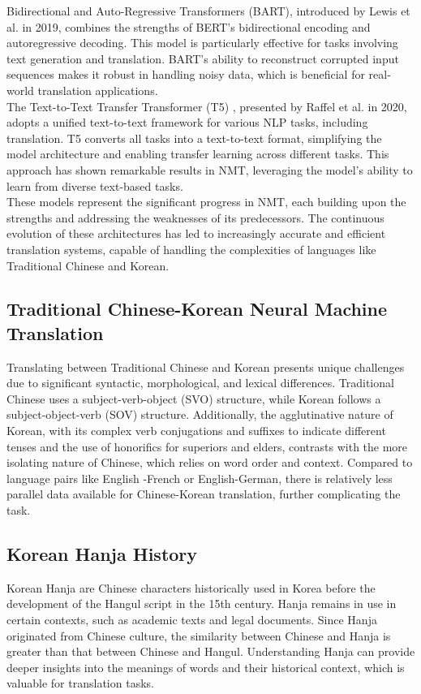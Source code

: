 \documentclass[PhD]{PHlab-thesis}
\begin{document}
	Bidirectional and Auto-Regressive Transformers (BART)\cite{lewis2019bart}, introduced by Lewis et al. in 2019, combines the strengths of BERT's bidirectional encoding and autoregressive decoding. This model is particularly effective for tasks involving text generation and translation. BART's ability to reconstruct corrupted input sequences makes it robust in handling noisy data, which is beneficial for real-world translation applications.\\
	The Text-to-Text Transfer Transformer (T5)\cite{raffel2020exploring} , presented by Raffel et al. in 2020, adopts a unified text-to-text framework for various NLP tasks, including translation. T5 converts all tasks into a text-to-text format, simplifying the model architecture and enabling transfer learning across different tasks. This approach has shown remarkable results in NMT, leveraging the model's ability to learn from diverse text-based tasks.\\
	These models represent the significant progress in NMT, each building upon the strengths and addressing the weaknesses of its predecessors. The continuous evolution of these architectures has led to increasingly accurate and efficient translation systems, capable of handling the complexities of languages like Traditional Chinese and Korean.\\

\subsection{Traditional Chinese-Korean Neural Machine Translation}
Translating between Traditional Chinese and Korean presents unique challenges due to significant syntactic, morphological, and lexical differences. Traditional Chinese uses a subject-verb-object (SVO) structure, while Korean follows a subject-object-verb (SOV) structure. Additionally, the agglutinative nature of Korean, with its complex verb conjugations and suffixes to indicate different tenses and the use of honorifics for superiors and elders, contrasts with the more isolating nature of Chinese, which relies on word order and context. Compared to language pairs like English -French or English-German, there is relatively less parallel data available for Chinese-Korean translation, further complicating the task.\\


\subsection{Korean Hanja History}
Korean Hanja are Chinese characters historically used in Korea before the development of the Hangul script in the 15th century. Hanja remains in use in certain contexts, such as academic texts and legal documents. Since Hanja originated from Chinese culture, the similarity between Chinese and Hanja is greater than that between Chinese and Hangul. Understanding Hanja can provide deeper insights into the meanings of words and their historical context, which is valuable for translation tasks. 
\end{document}
